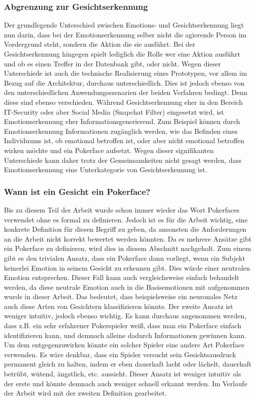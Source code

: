 \documentclass[12pt, a4paper]{report}
\begin{document}
\subsubsection{Abgrenzung zur Gesichtserkennung}
Der grundlegende Unterschied zwischen Emotions- und Gesichtserkennung liegt nun darin, dass bei der Emotionserkennung selber nicht die agierende Person im Vordergrund steht, sondern die Aktion die sie ausführt. Bei der Gesichtserkennung hingegen spielt lediglich die Rolle wer eine Aktion ausführt und ob es einen Treffer in der Datenbank gibt, oder nicht. Wegen dieser Unterschiede ist auch die technische Realisierung eines Prototypen, vor allem im Bezug auf die Architektur,  durchaus unterschiedlich. Dies ist jedoch ebenso von den unterschiedlichen Anwendungsszenarien der beiden Verfahren bedingt.
Denn diese sind ebenso verschieden. Während Gesichtserkennung eher in den Bereich IT-Security oder aber Social Media (Snapchat Filter) eingesetzt wird, ist Emotionserkennung eher Informationsgenerierend.
Zum Beispiel können durch Emotionserkennung Informationen zugänglich werden, wie das Befinden eines Individuums ist, ob emotional betroffen ist, oder aber nicht emotional betroffen wirken möchte und ein Pokerface aufsetzt.
Wegen dieser signifikanten Unterschiede kann daher trotz der Gemeinsamkeiten nicht gesagt werden, dass Emotionserkennung eine Unterkategorie von Gesichtserkennung ist.

\subsubsection{Wann ist ein Gesicht ein Pokerface?}
\label{pokerface}
Bis zu diesem Teil der Arbeit wurde schon immer wieder das Wort Pokerfaces verwendet ohne es formal zu definieren. Jedoch ist es für die Arbeit wichtig, eine konkrete Definition für diesen Begriff zu geben, da ansonsten die Anforderungen an die Arbeit nicht korrekt bewertet werden könnten. Da es mehrere Ansätze gibt ein Pokerface zu definieren, wird dies in diesem Abschnitt nachgeholt. Zum einem gibt es den trivialen Ansatz, dass ein Pokerface dann vorliegt, wenn ein Subjekt keinerlei Emotion in seinem Gesicht zu erkennen gibt. Dies würde einer neutralen Emotion entsprechen. Dieser Fall kann auch vergleichsweise einfach behandelt werden, da diese neutrale Emotion auch in die Basisemotionen mit aufgenommen wurde in dieser Arbeit. Das bedeutet, dass beispielsweise ein neuronales Netz auch diese Arten von Gesichtern klassifizieren könnte. \newline
Der zweite Ansatz ist weniger intuitiv, jedoch ebenso wichtig. Es kann durchaus angenommen werden, dass z.B. ein sehr erfahrener Pokerspieler weiß, dass man ein Pokerface einfach identifizieren kann, und demnach alleine dadurch Informationen gewinnen kann. Um dem entgegenzuwirken könnte ein solcher Spieler eine andere Art Pokerface verwenden. Es wäre denkbar, dass ein Spieler versucht sein Gesichtsausdruck permanent gleich zu halten, indem er eben dauerhaft lacht oder lächelt, dauerhaft betrübt, wütend, ängstlich, etc. aussieht. Dieser Ansatz ist weniger intuitiv als der erste und könnte demnach auch weniger schnell erkannt werden. Im Verlaufe der Arbeit wird mit der zweiten Definition gearbeitet.
\end{document}
